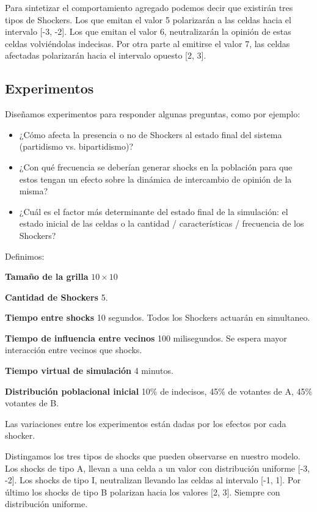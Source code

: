 Para sintetizar el comportamiento agregado podemos decir que existirán tres tipos de Shockers. Los que emitan el valor 5 polarizarán a las celdas hacia el intervalo [-3, -2]. Los que emitan el valor 6, neutralizarán la opinión de estas celdas volviéndolas indecisas. Por otra parte al emitirse el valor 7, las celdas afectadas polarizarán hacia el intervalo opuesto [2, 3].


\subsection{Experimentos}

Diseñamos experimentos para responder algunas preguntas, como por ejemplo:
\begin{itemize}
\item ¿Cómo afecta la presencia o no de Shockers al estado final del sistema (partidismo vs. bipartidismo)?
\item ¿Con qué frecuencia se deberían generar shocks en la población para que estos tengan un efecto sobre la dinámica de intercambio de opinión de la misma?
\item ¿Cuál es el factor más determinante del estado final de la simulación: el estado inicial de las celdas o la cantidad / características / frecuencia de los Shockers?
\end{itemize}

Definimos:

\begin{description}
    \item \textbf{Tamaño de la grilla}  $10 \times 10$
    \item \textbf{Cantidad de Shockers} 5.
    \item \textbf{Tiempo entre shocks} 10 segundos. Todos los Shockers actuarán en simultaneo.
    \item \textbf{Tiempo de influencia entre vecinos} 100 milisegundos. Se espera mayor interacción entre vecinos que shocks.
    \item \textbf{Tiempo virtual de simulación} 4 minutos.
    \item \textbf{Distribución poblacional inicial} 10\% de indecisos, 45\% de votantes de A, 45\% votantes de B.
\end{description}

Las variaciones entre los experimentos están dadas por los efectos por cada shocker.

Distingamos los tres tipos de shocks que pueden observarse en nuestro modelo.
Los shocks de tipo A, llevan a una celda a un valor con distribución
uniforme [-3, -2]. Los shocks de tipo I, neutralizan
llevando las celdas al intervalo  [-1, 1]. Por último los shocks de tipo B
polarizan hacia los valores [2, 3]. Siempre con distribución uniforme.

